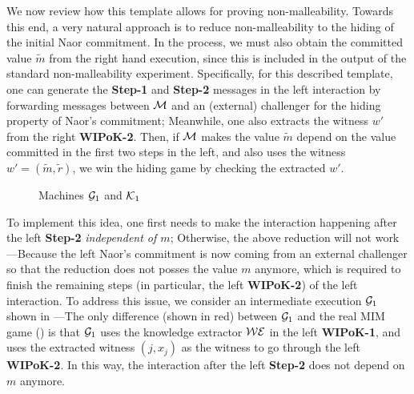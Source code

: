 We now review how this template allows for proving non-malleability. Towards this end, a very natural approach is to reduce non-malleability to the hiding of the initial Naor commitment. In the process, we must also obtain the committed value $\tilde{m}$ from the right hand execution, since this is included in the output of the standard non-malleability experiment. Specifically, for this described template, one can generate the {\bf Step-1} and {\bf Step-2} messages in the left interaction by forwarding messages between $\mathcal{M}$ and an (external) challenger for the hiding property of Naor's commitment; Meanwhile, one also extracts the witness $w'$ from the right {\bf WIPoK-2}. Then, if $\mathcal{M}$ makes the value $\tilde{m}$ depend on the value committed in the first two steps in the left, and also uses the witness $w'=(\tilde{m}, \tilde{r})$, we win the hiding game by checking the extracted $w'$. 

\begin{figure}[!tb]
     \begin{subfigure}[t]{0.47\textwidth}
         \centering
         \caption{}
         \label{figure:tech-overview:one-sided:G1}
     \end{subfigure}
     \hspace{6.5pt}
     \begin{subfigure}[t]{0.47\textwidth}
         \centering
         \caption{}
         \label{figure:tech-overview:one-sided:K1}
     \end{subfigure}
     \caption{Machines $\mathcal{G}_1$ and $\mathcal{K}_1$}
     \label{figure:tech-overview:one-sided:G1-K1}
\end{figure}


To implement this idea, one first needs to make the interaction happening after the left {\bf Step-2} {\em independent of $m$}; Otherwise, the above reduction will not work---Because the left Naor's commitment is now coming from an external challenger so that the reduction does not posses the value $m$ anymore, which is required to finish the remaining steps (in particular, the left {\bf WIPoK-2}) of the left interaction. To address this issue, we consider an intermediate execution $\mathcal{G}_1$ shown in ---The only difference (shown in red) between $\mathcal{G}_1$ and the real MIM game () is that $\mathcal{G}_1$ uses the knowledge extractor $\mathcal{WE}$ in the left {\bf WIPoK-1}, and uses the extracted witness $(j, x_j)$ as the witness to go through the left {\bf WIPoK-2}. In this way, the interaction after the left {\bf Step-2} does not depend on $m$ anymore. 

